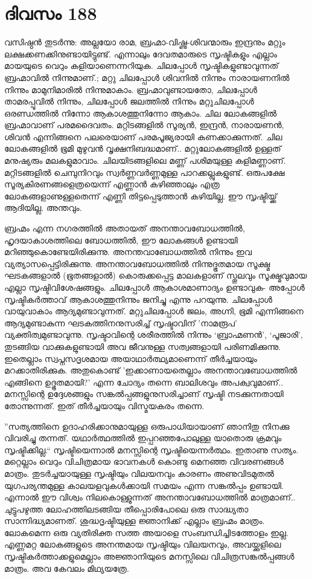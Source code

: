 \section{ദിവസം 188}


വസിഷ്ഠൻ തുടർന്നു: അല്ലയോ രാമ, ബ്രഹ്മാ-വിഷ്ണു-ശിവന്മാരും ഇന്ദ്രനും മറ്റും ലക്ഷക്കണക്കിനുണ്ടായിട്ടുണ്ട്. എന്നാലും ദേവതമാരുടെ സൃഷ്ടികളും എല്ലാം മായയുടെ വെറും കളിയാണെന്നറിയുക. ചിലപ്പോൾ സൃഷ്ടികളുണ്ടാവുന്നത് ബ്രഹ്മാവിൽ നിന്നുമാണ്‌.; മറ്റു ചിലപ്പോൾ ശിവനിൽ നിന്നും നാരായണനിൽ നിന്നും മാമുനിമാരിൽ നിന്നുമാകാം. ബ്രഹ്മാവുണ്ടായതോ, ചിലപ്പോൾ താമരപ്പൂവിൽ നിന്നും, ചിലപ്പോൾ ജലത്തിൽ നിന്നും മറ്റുചിലപ്പോൾ ഒരണ്ഡത്തിൽ നിന്നോ ആകാശത്തുനിന്നോ ആകാം. ചില ലോകങ്ങളിൽ ബ്രഹ്മാവാണ്‌ പരമദൈവതം. മറ്റിടങ്ങളിൽ സൂര്യൻ, ഇന്ദ്രൻ, നാരായണൻ, ശിവൻ എന്നിങ്ങനെ പലരെയാണ്‌ പരമപൂജ്യരായി കണക്കാക്കുന്നത്. ചില ലോകങ്ങളിൽ ഭൂമി മുഴുവൻ വൃക്ഷനിബദ്ധമാണ്‌..  മറ്റുലോകങ്ങളിൽ ഉള്ളത് മനുഷ്യരും മലകളുമാവാം. ചിലയിടങ്ങളിലെ മണ്ണ്‌ പശിമയുള്ള കളിമണ്ണാണ്‌. മറ്റിടങ്ങളിൽ ചെമ്പുനിറവും സ്വർണ്ണവർണ്ണമുള്ള പാറക്കല്ലുകളുണ്ട്. ഒരുപക്ഷേ സൂര്യകിരണങ്ങളെത്രയെന്ന് എണ്ണാൻ കഴിഞ്ഞാലും എത്ര ലോകങ്ങളാണുള്ളതെന്ന് എണ്ണി തിട്ടപ്പെടുത്താൻ കഴിയില്ല. ഈ സൃഷ്ടിയ്ക്ക് ആദിയില്ല. അന്തവും.

ബ്രഹ്മം എന്ന നഗരത്തിൽ അതായത് അനന്താവബോധത്തിൽ, ഹൃദയാകാശത്തിലെ ബോധത്തിൽ, ഈ ലോകങ്ങൾ ഉണ്ടായി മറിഞ്ഞുകൊണ്ടേയിരിക്കുന്നു. അനന്തവാബോധത്തിൽ നിന്നും ഇവ വ്യത്യാസപ്പെട്ടിരിക്കുന്നു. അനന്താവബോധത്തിൽ നിന്നുദ്ഭൂതമായ സൂക്ഷ്മ ഘടകങ്ങളാൽ (ഭൂതങ്ങളാൽ) കൊരുക്കപ്പെട്ട മാലകളാണ്‌ സ്തൂലവും സൂക്ഷ്മവുമായ എല്ലാ സൃഷ്ടിവിശേഷങ്ങളും. ചിലപ്പോൾ ആകാശമാണാദ്യം ഉണ്ടാവുക- അപ്പോൾ സൃഷ്ടികർത്താവ് ആകാശത്തുനിന്നും ജനിച്ചു എന്നു പറയുന്നു. ചിലപ്പോൾ വായുവാകാം ആദ്യമുണ്ടാവുന്നത്. മറ്റുചിലപ്പോൾ ജലം, അഗ്നി, ഭൂമി എന്നിങ്ങനെ ആദ്യമുണ്ടാകുന്ന ഘടകത്തിനനുസരിച്ച് സൃഷ്ടാവിന്‌ 'നാമരൂപ' വ്യക്തിത്വമുണ്ടാവുന്നു. സൃഷ്ടാവിന്റെ ശരീരത്തിൽ നിന്നും ‘ബ്രാഹ്മണൻ’, ‘പൂജാരി’, തുടങ്ങിയ വാക്കുകളുണ്ടായി അവ ജീവനുള്ള സത്വങ്ങളായി പരിണമിക്കുന്നു. ഇതെല്ലാം സ്വപ്നസദൃശമായ അയാഥാർത്ഥ്യമാണെന്ന് തീർച്ചയായും മറക്കാതിരിക്കുക. അതുകൊണ്ട് 'ഇക്കാണായതെല്ലാം അനന്താവബോധത്തിൽ എങ്ങിനെ ഉദ്ഭൂതമായി?' എന്ന ചോദ്യം തന്നെ ബാലിശവും അപക്വവുമാണ്‌.. മനസ്സിന്റെ ഉദ്ദേശങ്ങളും സങ്കൽപ്പങ്ങളുനുസരിച്ചാണ്‌ സൃഷ്ടി നടക്കുന്നതായി തോന്നുന്നത്. ഇത് തീർച്ചയായും വിസ്മയകരം തന്നെ.

”സത്യത്തിനെ ഉദാഹരിക്കാനുമായുള്ള ഒരുപാധിയായാണ്‌ ഞാനിതു നിനക്കു വിവരിച്ചു തന്നത്. യഥാർത്ഥത്തിൽ ഇപ്പറഞ്ഞപോലുള്ള യാതൊരു ക്രമവും സൃഷ്ടിക്കില്ല.“ സൃഷ്ടിയെന്നാൽ മനസ്സിന്റെ സൃഷ്ടിയെന്നർത്ഥം. ഇതാണു സത്യം. മറ്റെല്ലാം വെറും വിചിത്രമായ ഭാവനകൾ കൊണ്ടു മെനഞ്ഞ വിവരണങ്ങൾ മാത്രം. തുടർച്ചയായുള്ള സൃഷ്ടിയും വിലയനവും കാരണം അണുവിടമുതൽ യുഗപര്യന്തമുള്ള കാലയളവുകൾക്കായി സമയം എന്ന സങ്കൽപ്പം ഉണ്ടായി. എന്നാൽ ഈ വിശ്വം നിലകൊള്ളുന്നത് അനന്താവബോധത്തിൽ മാത്രമാണ്‌.. ചുട്ടുപഴുത്ത ലോഹത്തിലടങ്ങിയ തീപ്പൊരിപോലെ ഒരു സാദ്ധ്യതാ സാന്നിദ്ധ്യമാണത്. ശുദ്ധദൃഷ്ടിയുള്ള ജ്ഞാനിക്ക് എല്ലാം ബ്രഹ്മം മാത്രം. ലോകമെന്ന ഒരു വ്യതിരിക്ത സത്ത അയാളെ സംബന്ധിച്ചിടത്തോളം ഇല്ല. എണ്ണമറ്റ ലോകങ്ങളുടെ അനന്തമായ സൃഷ്ടിയും വിലയനവും, അവയ്ക്കുളിലെ സൃഷ്ടികർത്താക്കളുമെല്ലാം അജ്ഞാനിയുടെ മനസ്സിലെ വിചിത്രസങ്കൽപ്പങ്ങൾ മാത്രം. അവ കേവലം മിഥ്യയത്രേ.

